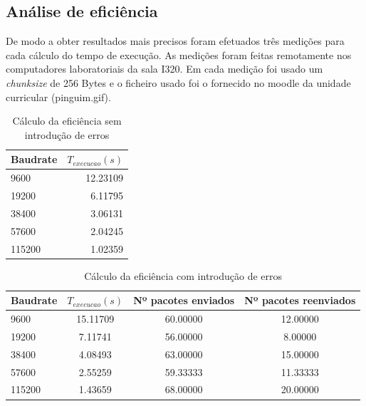 \documentclass[11pt]{report}
\begin{document}
\subsection{Análise de eficiência}

De modo a obter resultados mais precisos foram efetuados três medições
para cada cálculo do tempo de execução. As medições foram feitas remotamente
nos computadores laboratoriais da sala I320. Em cada medição foi usado um
\textit{chunksize} de 256 Bytes e o ficheiro usado foi o fornecido no moodle
da unidade curricular (pinguim.gif).
\begin{table}[h!]
  \begin{center}
    \caption{Cálculo da eficiência sem introdução de erros}
    \label{tab:table1}
    \begin{tabular}{l|r} %
        Baudrate & \textbf{$  T_{execucao} (s) $} \\
      \hline
        9600 & 12.23109\\
        19200 & 6.11795\\
        38400 & 3.06131\\
        57600 & 2.04245\\
        115200 & 1.02359\\
    \end{tabular}
  \end{center}
\end{table}

\begin{table}[h!]
  \begin{center}
    \caption{Cálculo da eficiência com introdução de erros}
    \label{tab:table1}
    \begin{tabular}{l|c|c|c} %
        Baudrate & \textbf{$  T_{execucao} (s) $} & Nº pacotes enviados & Nº pacotes reenviados \\
      \hline
        9600 & 15.11709 & 60.00000 & 12.00000\\
        19200 & 7.11741 & 56.00000 & 8.00000\\
        38400 & 4.08493 & 63.00000 & 15.00000\\
        57600 & 2.55259 & 59.33333 & 11.33333\\
        115200 & 1.43659 & 68.00000 & 20.00000\\
    \end{tabular}
  \end{center}
\end{table}
\end{document}
